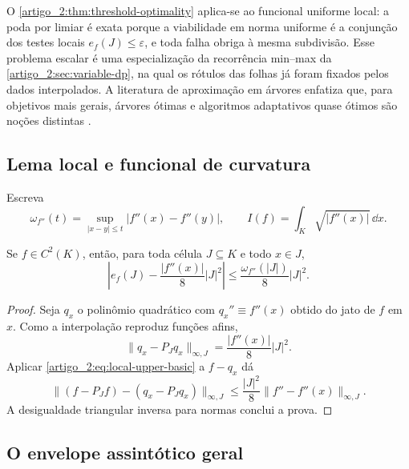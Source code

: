 O \cref{artigo_2:thm:threshold-optimality} aplica-se ao funcional uniforme local: a
poda por limiar é exata porque a
viabilidade em norma uniforme é a conjunção dos testes locais
$e_f(J)\le\varepsilon$, e toda falha obriga à mesma subdivisão. Esse problema
escalar é uma especialização da recorrência min--max da
\cref{artigo_2:sec:variable-dp}, na qual os
rótulos das folhas já foram fixados pelos dados interpolados. A literatura de
aproximação em árvores enfatiza que, para objetivos mais gerais, árvores
ótimas e algoritmos adaptativos quase ótimos são noções distintas
\citep{artigo_1-cohen2001,artigo_1-binev2004}.

\subsection{Lema local e funcional de curvatura}

Escreva
\[
 \omega_{f''}(t)=\sup_{|x-y|\le t}|f''(x)-f''(y)|,
 \qquad
 I(f)=\int_K\sqrt{|f''(x)|}\,\dd x.
\]

\begin{lemma}\label{map:artigo_2:11.2}
\label{artigo_2:lem:local-asymptotic-error}
Se $f\in C^2(K)$, então, para toda célula $J\subseteq K$ e todo $x\in J$,
\begin{equation}
 \left|e_f(J)-\frac{|f''(x)|}{8}|J|^2\right|
 \le \frac{\omega_{f''}(|J|)}{8}|J|^2.
 \label{artigo_2:eq:local-asymptotic-error}
\end{equation}
\end{lemma}

\begin{proof}
Seja $q_x$ o polinômio quadrático com $q_x''\equiv f''(x)$ obtido do jato de
$f$ em $x$. Como a interpolação reproduz funções afins,
\[
 \|q_x-P_Jq_x\|_{\infty,J}=\frac{|f''(x)|}{8}|J|^2.
\]
Aplicar \eqref{artigo_2:eq:local-upper-basic} a $f-q_x$ dá
\[
 \|(f-P_Jf)-(q_x-P_Jq_x)\|_{\infty,J}
 \le\frac{|J|^2}{8}\|f''-f''(x)\|_{\infty,J}.
\]
A desigualdade triangular inversa para normas conclui a prova.
\end{proof}

\subsection{O envelope assintótico geral}

